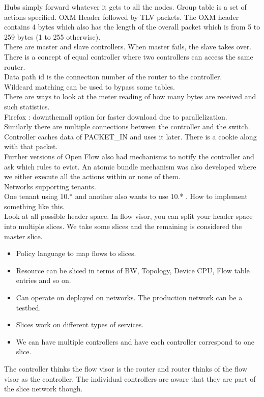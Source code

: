\documentclass[solution,addpoints,12pt]{exam}
\begin{document}
Hubs simply forward whatever it gets to all the nodes.
Group table is a set of actions specified.
OXM Header followed by TLV packets. The OXM header contains
4 bytes which also has the length of the overall packet which is
from 5 to 259 bytes (1 to 255 otherwise).\\
There are master and slave controllers. When master fails,
the slave takes over. There is a concept of equal controller
where two controllers can access the same router.\\
Data path id is the connection number of the router to the
controller.\\
Wildcard matching can be used to bypass some tables.\\
There are ways to look at the meter reading of how many bytes
are received and such statistics.\\
Firefox : downthemall option for faster download due to parallelization.\\
Similarly there are multiple connections between the controller and the
switch.\\
Controller caches data of PACKET\_IN and uses it later. There
is a cookie along with that packet.\\

Further versions of Open Flow also had mechanisms to
notify the controller and ask which rules to evict.
An atomic bundle mechanism was also developed where
we either execute all the actions within or none of them.\\

Networks supporting tenants.\\
One tenant using 10.* and another also wants to use 10.* .
How to implement something like this.\\

Look at all possible header space. In flow visor,
you can split your header space into multiple slices.
We take some slices and the remaining is considered the master slice.\\
\begin{itemize}
\item Policy language to map flows to slices.
\item Resource can be sliced in terms of BW, Topology, Device CPU,
Flow table entries and so on.
\item Can operate on deplayed on networks. The production
network can be a testbed.
\item Slices work on different types of services.
\item We can have multiple controllers and have each controller correspond to
one slice.
\end{itemize}
The controller thinks the flow visor is the router and router thinks
of the flow visor as the controller. The individual controllers
are aware that they are part of the slice network though.\\
\end{document}
